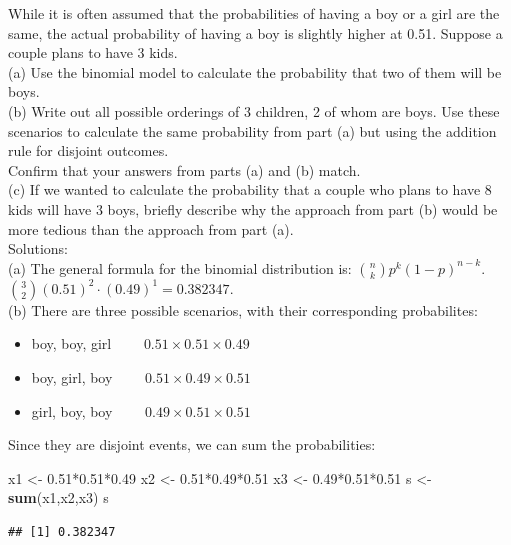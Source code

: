 \documentclass[]{article}
\newenvironment{Shaded}{\begin{snugshade}}{\end{snugshade}}
\newcommand{\KeywordTok}[1]{\textcolor[rgb]{0.13,0.29,0.53}{\textbf{{#1}}}}
\newcommand{\FloatTok}[1]{\textcolor[rgb]{0.00,0.00,0.81}{{#1}}}
\newcommand{\StringTok}[1]{\textcolor[rgb]{0.31,0.60,0.02}{{#1}}}
\newcommand{\NormalTok}[1]{{#1}}
\providecommand{\tightlist}{%
  \setlength{\itemsep}{0pt}\setlength{\parskip}{0pt}}
\begin{document}
While it is often assumed that the probabilities of having a boy or a
girl are the same, the actual probability of having a boy is slightly
higher at 0.51. Suppose a couple plans to have 3 kids.\\
(a) Use the binomial model to calculate the probability that two of them
will be boys.\\
(b) Write out all possible orderings of 3 children, 2 of whom are boys.
Use these scenarios to calculate the same probability from part (a) but
using the addition rule for disjoint outcomes.\\
Confirm that your answers from parts (a) and (b) match.\\
(c) If we wanted to calculate the probability that a couple who plans to
have 8 kids will have 3 boys, briefly describe why the approach from
part (b) would be more tedious than the approach from part (a).\\
Solutions:\\
(a) The general formula for the binomial distribution is:
\(\binom{n}{k}p^k(1-p)^{n-k}\).
\(\binom{3}{2}(0.51)^{2}\cdot(0.49)^{1} = 0.382347.\)\\
(b) There are three possible scenarios, with their corresponding
probabilites:\\

\begin{itemize}
\tightlist
\item
  boy, boy, girl \(\qquad 0.51\times0.51\times0.49\)
\item
  boy, girl, boy \(\qquad 0.51\times0.49\times0.51\)
\item
  girl, boy, boy \(\qquad 0.49\times0.51\times0.51\)
\end{itemize}

Since they are disjoint events, we can sum the probabilities:

\begin{Shaded}
\begin{Highlighting}[]
\NormalTok{x1 <-}\StringTok{ }\FloatTok{0.51}\NormalTok{*}\FloatTok{0.51}\NormalTok{*}\FloatTok{0.49}
\NormalTok{x2 <-}\StringTok{ }\FloatTok{0.51}\NormalTok{*}\FloatTok{0.49}\NormalTok{*}\FloatTok{0.51}
\NormalTok{x3 <-}\StringTok{ }\FloatTok{0.49}\NormalTok{*}\FloatTok{0.51}\NormalTok{*}\FloatTok{0.51}
\NormalTok{s <-}\StringTok{ }\KeywordTok{sum}\NormalTok{(x1,x2,x3)}
\NormalTok{s}
\end{Highlighting}
\end{Shaded}

\begin{verbatim}
## [1] 0.382347
\end{verbatim}
\end{document}
